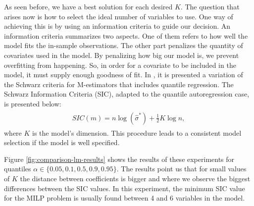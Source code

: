 As seen before, we have a best solution for each desired $K$. The question that arises now is how to select the ideal number of variables to use.
One way of achieving this is by using an information criteria to guide our decision. 
An information criteria summarizes two aspects. One of them refers to how well the model fits the in-sample observations. The other part penalizes the quantity of covariates used in the model. By penalizing how big our model is, we prevent overfitting from happening. So, in order for a covariate to be included in the model, it must supply enough goodness of fit.
In \cite{machado1993robust}, it is presented a variation of the Schwarz criteria for M-estimators that includes quantile regression. The Schwarz Information Criteria (SIC), adapted to the quantile autoregression case, is presented below:
\begin{align} 
\begin{split}
SIC(m) = n \log(\hat{\sigma}^*)+\frac{1}{2}K\log n,\label{eq:SIC}
\end{split}					
\end{align}
where $K$ is the model's dimension. This procedure leads to a consistent model selection if the model is well specified. 

Figure \ref{fig:comparison-lm-results} shows the results of these experiments for quantiles $\alpha \in \{0.05, 0.1, 0.5, 0.9, 0.95\}$. The results point us that for small values of $K$ the distance between coefficients is bigger and where we observe the biggest differences between the SIC values. In this experiment, the minimum SIC value for the MILP problem is usually found between 4 and 6 variables in the model.

